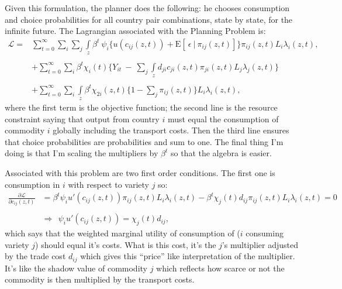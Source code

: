 \documentclass[12pt,pdftex]{article}
\begin{document}
\begin{onehalfspacing}
Given this formulation, the planner does the following: he chooses consumption and choice probabilities for all country pair combinations, state by state, for the infinite future. The Lagrangian associated with the Planning Problem is:
\begin{align}
\mathcal{L}  = & \sum_{t=0}^{\infty}   \sum_{i} \sum_{j} \int\limits_{z}  \beta^{t} \ \psi_{i} \bigg \{  u(c_{ij}(z, t) ) + \mathrm{E}[ \ \epsilon \ | \ \pi_{ij}(z,t) ] \bigg \}\pi_{ij}(z,t) L_{i} \lambda_{i}(z, t), \\
\nonumber \\
&+ \sum_{t=0}^{\infty} \sum_{i} \beta^{t} \chi_{i}(t) \bigg \{ Y_{it} \  - \ \sum_{j} \int\limits_{z}  d_{ji} c_{ji}(z, t) \pi_{ji}(z,t) L_{j}\lambda_{j}(z, t) \bigg \} \nonumber \\
\nonumber \\
&+ \sum_{t=0}^{\infty} \sum_{i} \int\limits_{z}  \beta^{t} \chi_{2i}(z,t) \bigg \{1 - \sum_{j}\pi_{ij}(z,t) \bigg \} L_{i} \lambda_{i}(z, t), \nonumber
\label{eq:planning-problem}
\end{align}
where the first term is the objective function; the second line is the resource constraint saying that output from country $i$ must equal the consumption of commodity $i$ globally including the transport costs. Then the third line ensures that choice probabilities are probabilities and sum to one. The final thing I'm doing is that I'm scaling the multipliers by $\beta^t$ so that the algebra is easier.

Associated with this problem are two first order conditions. The first one is consumption in $i$ with respect to variety $j$ so:
\begin{align}
\frac{\partial \mathcal{L} }{\partial c_{ij}(z, t)} &=  \beta^{t} \psi_{i} u'(c_{ij}(z, t))  \pi_{ij}(z,t) L_{i} \lambda_{i}(z, t) - \beta^{t} \chi_{j}(t) d_{ij} \pi_{ij}(z,t) L_{i} \lambda_{i}(z, t) = 0 \\
\nonumber \\
& \Rightarrow \ \ \psi_{i} u'(c_{ij}(z, t) ) = \chi_{j}(t) d_{ij}, \label{apx-eq:muc}
\end{align}
which says that the weighted marginal utility of consumption of ($i$ consuming variety $j$) should equal it's costs. What is this cost, it's the $j$'s multiplier adjusted by the trade cost $d_{ij}$ which gives this ``price'' like interpretation of the multiplier. It's like the shadow value of commodity $j$ which reflects how scarce or not the commodity is then multiplied by the transport costs.


\end{onehalfspacing}
\end{document}

